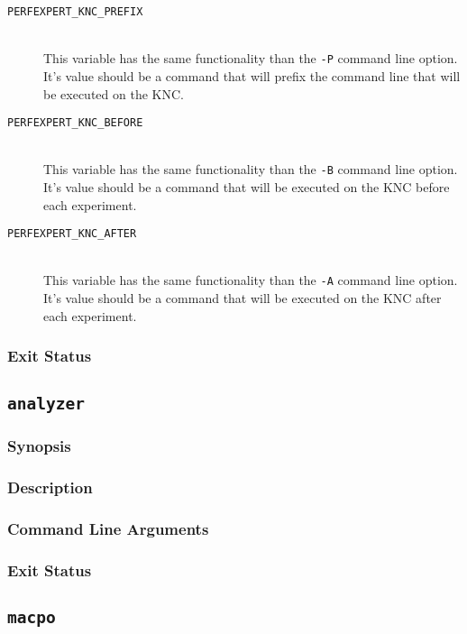\begin{description}
	\item[\texttt{PERFEXPERT\_KNC\_PREFIX}]\hfill \\
	This variable has the same functionality than the \texttt{-P} command line option. It's value should be a command that will prefix the command line that will be executed on the KNC.

	\item[\texttt{PERFEXPERT\_KNC\_BEFORE}]\hfill \\
	This variable has the same functionality than the \texttt{-B} command line option. It's value should be a command that will be executed on the KNC before each experiment.

	\item[\texttt{PERFEXPERT\_KNC\_AFTER}]\hfill \\
	This variable has the same functionality than the \texttt{-A} command line option. It's value should be a command that will be executed on the KNC after each experiment.

\end{description}

\subsubsection{Exit Status}

\subsection{\texttt{analyzer}}

\subsubsection{Synopsis}

\subsubsection{Description}

\subsubsection{Command Line Arguments}

\subsubsection{Exit Status}

\subsection{\texttt{macpo}}

